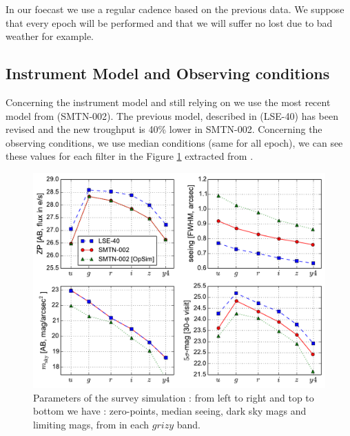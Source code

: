 \documentclass[\docopts]{\docclass}
\begin{document}
In our foecast we use a regular cadence based on the previous data. We suppose that every epoch will be performed and that we will suffer no lost due to bad weather for example.

\subsection{Instrument Model and Observing conditions}

Concerning the instrument model and still relying on \cite{SN-CADENCE} we use the most recent model from \cite{SMTN-002} (SMTN-002). The previous model, described in \cite{LSE-40} (LSE-40) has been revised and the new troughput is 40\% lower  in SMTN-002.
Concerning the observing conditions, we use median conditions (same for all epoch), we can see these values for each filter in the Figure \ref{fig:zp} extracted from \cite{SN-CADENCE}.

\begin{figure}[t]
\begin{center}
\includegraphics[width=\linewidth]{lsst_model_summary.pdf}
\caption{Parameters of the survey simulation : from left to right and top to bottom we have : zero-points, median seeing, dark sky mags and limiting mags, from \cite{SN-CADENCE} in each $grizy$ band.}
\label{fig:zp}
\end{center}
\end{figure}
\end{document}
